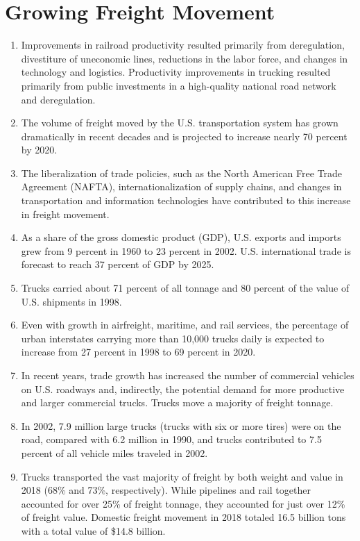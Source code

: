 \documentclass[
]{book}
\begin{document}
\hypertarget{intro-Freight_movement}{%
\section{Growing Freight Movement}\label{intro-Freight_movement}}

\begin{enumerate}
\def\labelenumi{\arabic{enumi})}
\item
  Improvements in railroad productivity resulted primarily from deregulation, divestiture of uneconomic lines, reductions in the labor force, and changes in technology and logistics. Productivity improvements in trucking resulted primarily from public investments in a high-quality national road network and deregulation.
\item
  The volume of freight moved by the U.S. transportation system has grown dramatically in recent decades and is projected to increase nearly 70 percent by 2020.
\item
  The liberalization of trade policies, such as the North American Free Trade Agreement (NAFTA), internationalization of supply chains, and changes in transportation and information technologies have contributed to this increase in freight movement.
\item
  As a share of the gross domestic product (GDP), U.S. exports and imports grew from 9 percent in 1960 to 23 percent in 2002. U.S. international trade is forecast to reach 37 percent of GDP by 2025.
\item
  Trucks carried about 71 percent of all tonnage and 80 percent of the value of U.S. shipments in 1998.
\item
  Even with growth in airfreight, maritime, and rail services, the percentage of urban interstates carrying more than 10,000 trucks daily is expected to increase from 27 percent in 1998 to 69 percent in 2020.
\item
  In recent years, trade growth has increased the number of commercial vehicles on U.S. roadways and, indirectly, the potential demand for more productive and larger commercial trucks. Trucks move a majority of freight tonnage.
\item
  In 2002, 7.9 million large trucks (trucks with six or more tires) were on the road, compared with 6.2 million in 1990, and trucks contributed to 7.5 percent of all vehicle miles traveled in 2002.
\item
  Trucks transported the vast majority of freight by both weight and value in 2018 (68\% and 73\%, respectively). While pipelines and rail together accounted for over 25\% of freight tonnage, they accounted for just over 12\% of freight value. Domestic freight movement in 2018 totaled 16.5 billion tons with a total value of \$14.8 billion.
\end{enumerate}
\end{document}

